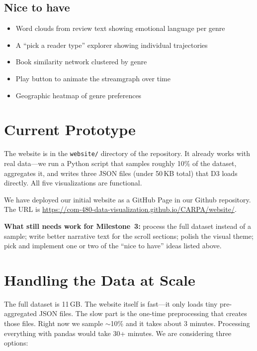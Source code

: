 \documentclass[11pt,a4paper]{article}
\begin{document}
\subsection{Nice to have}
\begin{itemize}[leftmargin=1.5em, itemsep=1pt]
  \item Word clouds from review text showing emotional language per genre 
  \item A ``pick a reader type'' explorer showing individual trajectories
  \item Book similarity network clustered by genre 
  \item Play button to animate the streamgraph over time 
  \item Geographic heatmap of genre preferences 
\end{itemize}

\section{Current Prototype}

The website is in the \texttt{website/} directory of the repository. It already works with real data---we run a Python script that samples roughly 10\% of the dataset, aggregates it, and writes three JSON files (under 50\,KB total) that D3 loads directly. All five visualizations are functional.

We have deployed our initial website as a GitHub Page in our Github repository. The URL is \url{https://com-480-data-visualization.github.io/CARPA/website/}.

\textbf{What still needs work for Milestone~3:} process the full dataset instead of a sample; write better narrative text for the scroll sections; polish the visual theme; pick and implement one or two of the ``nice to have'' ideas listed above.

\section{Handling the Data at Scale}

The full dataset is 11\,GB. The website itself is fast---it only loads tiny pre-aggregated JSON files. The slow part is the one-time preprocessing that creates those files. Right now we sample $\sim$10\% and it takes about 3 minutes. Processing everything with pandas would take 30+ minutes. We are considering three options:
\end{document}
